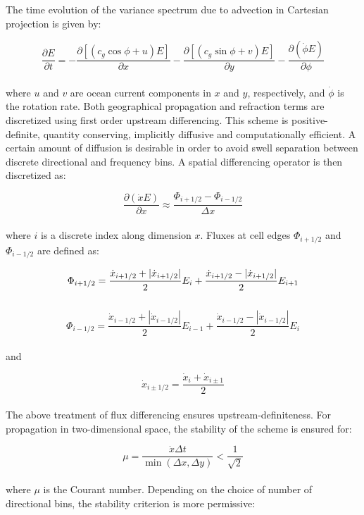 \documentclass[letterpaper]{article}
\numberwithin{equation}{section}
\begin{document}
The time evolution of the variance spectrum due to advection in Cartesian projection is given by:

\begin{equation}
\dfrac{\partial E}{\partial t} = 
-\dfrac{\partial [(c_{g}\cos{\phi}+u)E]}{\partial x} 
-\dfrac{\partial [(c_{g}\sin{\phi}+v)E]}{\partial y} 
-\dfrac{\partial (\dot{\phi}E)}{\partial \phi}
\end{equation}
\\
where $u$ and $v$ are ocean current components in $x$ and $y$, respectively, and $\dot{\phi}$ is the rotation rate.
Both geographical propagation and refraction terms are discretized using first order upstream differencing.
This scheme is positive-definite, quantity conserving, 
implicitly diffusive and computationally efficient.
A certain amount of diffusion is desirable in order to avoid swell separation between discrete directional and frequency bins.
A spatial differencing operator is then discretized as:

\begin{equation}
\dfrac{\partial (\dot{x}E)}{\partial x} \approx \dfrac{\Phi_{i+1/2}-\Phi_{i-1/2}}{\Delta x}\label{advection} 
\end{equation}
\\
where $i$ is a discrete index along dimension $x$. 
Fluxes at cell edges $\Phi_{i+1/2}$ and $\Phi_{i-1/2}$ are defined as:

\begin{equation}
\Phi_{i+1/2}=\dfrac{\dot{x}_{i+1/2}+|\dot{x}_{i+1/2}|}{2}E_{i}+\dfrac{\dot{x}_{i+1/2}-|\dot{x}_{i+1/2}|}{2}E_{i+1}\label{fluxout} \\
\end{equation}
\\
\begin{equation}
\Phi_{i-1/2}=\dfrac{\dot{x}_{i-1/2}+|\dot{x}_{i-1/2}|}{2}E_{i-1}+\dfrac{\dot{x}_{i-1/2}-|\dot{x}_{i-1/2}|}{2}E_{i}\label{fluxin}
\end{equation} 
\\
and 

\begin{equation}
\dot{x}_{i\pm 1/2} = \dfrac{\dot{x}_{i}+\dot{x}_{i\pm 1}}{2}\label{average}
\end{equation}
\\
The above treatment of flux differencing ensures upstream-definiteness.
For propagation in two-dimensional space, the stability of the scheme is ensured for:

\begin{equation}
\mu = \dfrac{\dot{x}\Delta t}{\min{(\Delta x,\Delta y)}} < \dfrac{1}{\sqrt{2}}
\end{equation}
\\
where $\mu$ is the Courant number.
Depending on the choice of number of directional bins, the stability criterion is more permissive:
\end{document}
